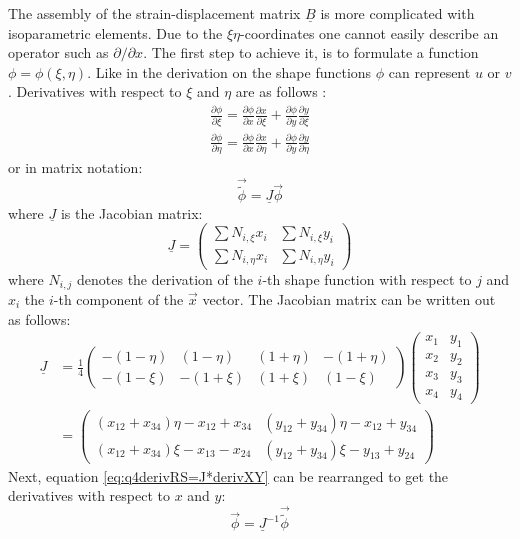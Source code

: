   The assembly of the strain-displacement matrix $\underline{B}$ is more complicated with isoparametric elements. Due to the $\xi\eta$-coordinates one cannot easily describe an operator such as $\partial/\partial x$. The first step to achieve it, is to formulate a function $\phi = \phi(\xi,\eta)$. Like in the derivation on the shape functions $\phi$ can represent $u$ or $v$. Derivatives with respect to $\xi$ and $\eta$ are as follows \cite{cook2002concepts}:
  \begin{align}
  \frac{\partial \phi}{\partial \xi} = \frac{\partial \phi}{\partial x} \frac{\partial x}{\partial \xi} + \frac{\partial \phi}{\partial y} \frac{\partial y}{\partial \xi} \nonumber\\
  \frac{\partial \phi}{\partial \eta} = \frac{\partial \phi}{\partial x} \frac{\partial x}{\partial \eta} + \frac{\partial \phi}{\partial y} \frac{\partial y}{\partial \eta}
  \end{align}
  or in matrix notation:
  \begin{equation}\label{eq:q4derivRS=J*derivXY}
  \vec{\tilde{\phi}} = \underline{J} \vec{\phi}
  \end{equation}
  where $\underline{J}$ is the Jacobian matrix:
  \begin{equation}
  \underline{J} = \begin{pmatrix}
  \sum N_{i,\xi}x_i & \sum N_{i,\xi}y_i\\
  \sum N_{i,\eta}x_i & \sum N_{i,\eta}y_i
  \end{pmatrix}
  \end{equation}
  where $N_{i,j}$ denotes the derivation of the $i$-th shape function with respect to $j$ and $x_i$ the $i$-th component of the $\vec{x}$ vector. The Jacobian matrix can be written out as follows:
  \begin{align}
  \underline{J} &= \frac{1}{4}\begin{pmatrix}
  -(1-\eta) & (1-\eta) & (1+\eta) & -(1+\eta)\\
  -(1-\xi) & -(1+\xi) & (1+\xi) & (1-\xi)
  \end{pmatrix} \begin{pmatrix}
  x_1 & y_1\\
  x_2 & y_2\\
  x_3 & y_3\\
  x_4 & y_4
  \end{pmatrix} \nonumber\\
  &= \begin{pmatrix}
  (x_{12}+x_{34})\eta - x_{12} + x_{34} & (y_{12} + y_{34})\eta - x_{12} + y_{34}\\
  (x_{12}+x_{34})\xi  - x_{13} - x_{24} & (y_{12} + y_{34})\xi  - y_{13} + y_{24}
  \end{pmatrix}
  \end{align}
  Next, equation \ref{eq:q4derivRS=J*derivXY} can be rearranged to get the derivatives with respect to $x$ and $y$:
  \begin{equation}
  \vec{\phi} = \underline{J}^{-1}\vec{\tilde{\phi}}
  \end{equation}
  
